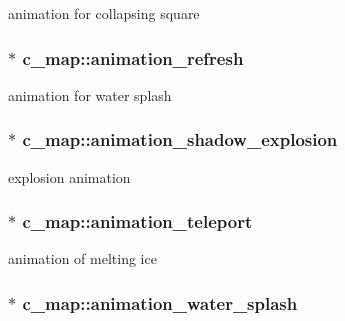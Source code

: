 animation for collapsing square \hypertarget{classc__map_a27650c86dc14f11dff3d582f3ffd540e}{
\subsubsection[{animation\-\_\-refresh}]{$\ast$ c\-\_\-map\-::animation\-\_\-refresh\hspace{0.3cm}{\ttfamily [protected]}}}\label{classc__map_a27650c86dc14f11dff3d582f3ffd540e}
animation for water splash \hypertarget{classc__map_ad52da3cd4cd1e0c88ce8170314b09f78}{
\subsubsection[{animation\-\_\-shadow\-\_\-explosion}]{$\ast$ c\-\_\-map\-::animation\-\_\-shadow\-\_\-explosion\hspace{0.3cm}{\ttfamily [protected]}}}\label{classc__map_ad52da3cd4cd1e0c88ce8170314b09f78}
explosion animation \hypertarget{classc__map_a812ca3ddb1f4ff364861a4a4f3318caf}{
\subsubsection[{animation\-\_\-teleport}]{$\ast$ c\-\_\-map\-::animation\-\_\-teleport\hspace{0.3cm}{\ttfamily [protected]}}}\label{classc__map_a812ca3ddb1f4ff364861a4a4f3318caf}
animation of melting ice \hypertarget{classc__map_a777d0b0ec7a0a14c1ccae809cb09f4b1}{
\subsubsection[{animation\-\_\-water\-\_\-splash}]{$\ast$ c\-\_\-map\-::animation\-\_\-water\-\_\-splash\hspace{0.3cm}{\ttfamily [protected]}}}\label{classc__map_a777d0b0ec7a0a14c1ccae809cb09f4b1}
